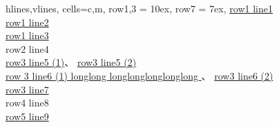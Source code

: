 \documentclass[a4paper,12pt]{ctexrep}
\begin{document}
\begin{table}
	\centering
	\begin{tblr}[
		tall,
		note{$\dag$} = {Comment for tblr.},
		]{
		hlines,vlines,
		cells={c,m},
		row{1,3} = {10ex},
				row{7} = {7ex},
			}
			{%
		\href{127.0.0.1}{row1 line1}     \\
		\href{127.0.0.1}{row1 line2}     \\
				\href{127.0.0.1}{row1 line3}%
		}                                \\
		{row2 line4}\TblrNote{$\dag$}    \\
		{%
		\href{127.0.0.1}{row3 line5 (1)}、%
		\href{127.0.0.1}{row3 line5 (2)} \\
		\href{127.0.0.1}{%
			row 3 line6 (1) longlong%
			longlonglonglonglong%
		}、%
		\href{127.0.0.1}{row3 line6 (2)} \\
		\href{127.0.0.1}{%
			row3 line7}%
		}                                \\
		{row4 line8}                     \\
		{%
		{%
				\href{127.0.0.1}{row5 line9}%
			}
		}                                \\
	\end{tblr}
\end{table}
\end{document}

